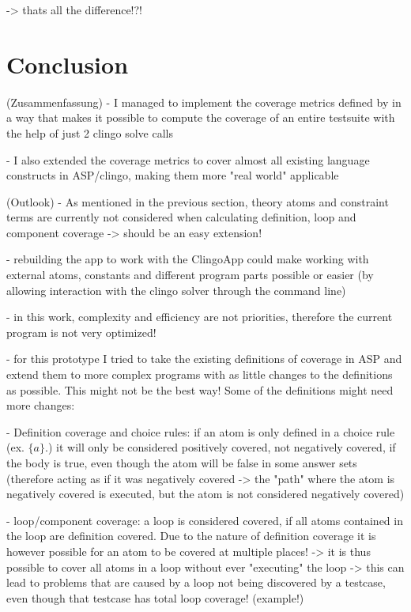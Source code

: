 -> thats all the difference!?!

\chapter{Conclusion}
\label{ch:Conclusion}
(Zusammenfassung)
- I managed to implement the coverage metrics defined by \textcite{Jan+10} in a way that makes it possible to compute the coverage 
of an entire testsuite with the help of just 2 clingo solve calls

- I also extended the coverage metrics to cover almost all existing language constructs in ASP/clingo, making them more "real world" 
applicable


(Outlook)
- As mentioned in the previous section, theory atoms and constraint terms are currently not considered when calculating definition, loop 
and component coverage -> should be an easy extension!

- rebuilding the app to work with the ClingoApp could make working with external atoms, constants and different program parts possible 
or easier (by allowing interaction with the clingo solver through the command line)

- in this work, complexity and efficiency are not priorities, therefore the current program is not very optimized!

- for this prototype I tried to take the existing definitions of coverage in ASP and extend them to more complex programs with as little 
changes to the definitions as possible. This might not be the best way! Some of the definitions might need more changes:

    - Definition coverage and choice rules: if an atom is only defined in a choice rule (ex. $\{a\}.$) it will only be considered positively 
    covered, not negatively covered, if the body is true, even though the atom will be false in some answer sets (therefore acting as if 
    it was negatively covered -> the "path" where the atom is negatively covered is executed, but the atom is not considered negatively covered)

    - loop/component coverage: a loop is considered covered, if all atoms contained in the loop are definition covered. Due to the nature 
    of definition coverage it is however possible for an atom to be covered at multiple places! -> it is thus possible to cover all 
    atoms in a loop without ever "executing" the loop -> this can lead to problems that are caused by a loop not being discovered by 
    a testcase, even though that testcase has total loop coverage! (example!)

